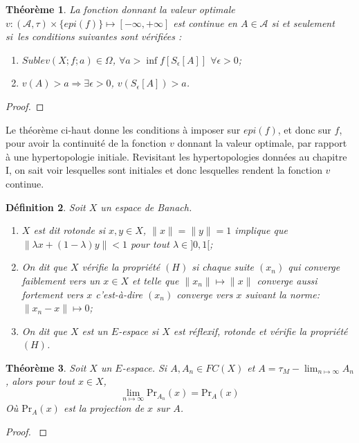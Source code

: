 \documentclass[11pt]{report}
\newenvironment{boxtheorem}
{\begin{tcolorbox}
		[enhanced jigsaw,breakable,pad at break*=2mm,
		colback=black!5,colframe=bleueLeger]}
	{\end{tcolorbox}}
\newenvironment{boxdefinition}
{\begin{tcolorbox}
		[enhanced jigsaw,breakable,pad at break*=1mm,
		colback=black!5!white,boxrule=0pt,frame hidden,
		borderline west={1.5mm}{-2mm}{blue}]}
	{\end{tcolorbox}}
\theoremstyle{styletheorem}
\newtheorem{theoreme}{Théorème}[section]
\newenvironment{theorem}
{\vspace*{0.3cm}\begin{boxtheorem}\begin{theoreme}}{\end{theoreme}\end{boxtheorem}\vspace*{0.3cm}}
\theoremstyle{styledef}
\newtheorem{definitions}[theoreme]{Définition}
\theoremstyle{remark}
\newenvironment{definition}{\vspace*{0.3cm}\begin{boxdefinition}\begin{definitions}}{\end{definitions}\end{boxdefinition}\vspace*{0.3cm}}
\newcommand{\ie}{c'est-à-dire }
\newcommand{\ssi}{si et seulement si\  }
\begin{document}
	\begin{theorem}
		La fonction donnant la valeur optimale $v\colon (\mathcal{A}, \tau) \times \lbrace epi (f) \rbrace \mapsto [-\infty, +\infty]$ est continue  en $A \in \mathcal{A}$ \ssi les conditions suivantes sont vérifiées :
		\begin{enumerate}[label=(\roman*)]
			\item $Sublev(X;f;a) \in \Omega$, $\forall a > \inf f[S_\epsilon[A]]$ $\forall \epsilon >0$;	
			\item $v(A) > a \Rightarrow \exists \epsilon >0$, $v(S_\epsilon [A]) > a$.
		\end{enumerate} 
	\end{theorem}
	\begin{proof}
		
	\end{proof}
	Le théorème ci-haut donne les conditions à imposer sur $epi (f)$, et donc sur $f$, pour avoir la continuité de la fonction $v$ donnant la valeur optimale, par rapport à une hypertopologie initiale. Revisitant les hypertopologies données au chapitre I, on sait voir lesquelles sont initiales et donc lesquelles rendent la fonction $v$ continue.
	\begin{definition}Soit $X$ un espace de Banach.
		\begin{enumerate}
			\item $X$ est dit rotonde si $x,y \in X$, $\lVert x \rVert = \lVert y \rVert = 1$ implique que $\lVert \lambda x +(1-\lambda )y\rVert <1$ pour tout $\lambda \in ]0,1[$;
			\item On dit que $X$ vérifie la propriété $(H)$ si chaque suite $(x_n)$ qui converge faiblement vers un $x \in X$ et telle que $\lVert x_n \rVert \mapsto \lVert x \rVert$ converge aussi fortement vers $x$ \ie $(x_n)$ converge vers $x$ suivant la norme: $\lVert x_n -x\rVert \mapsto 0$;
			\item On dit que $X$ est un $E$-espace si $X$ est réflexif, rotonde et vérifie la propriété $(H)$.
		\end{enumerate}
	\end{definition}
	
	\begin{theorem}
		Soit $X$ un $E$-espace. Si $A, A_n \in FC(X)$ et $A = \tau_M - \lim_{n\mapsto \infty} A_n$, alors pour tout $x \in X$, $$\lim_{n\mapsto \infty} \mathrm{Pr}_{A_n} (x) =\mathrm{Pr}_A (x)$$
		Où $\mathrm{Pr}_A (x)$ est la projection de $x$ sur $A$. 
	\end{theorem}
	\begin{proof}
		\cite{b21}
	\end{proof}
	
\end{document}
